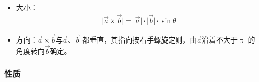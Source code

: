 \documentclass[
	11pt, %
	a4paper, %
]{WhuSakuraBook}
\begin{document}
    \begin{itemize}
        \item 大小：
            \begin{align}
                \lvert \overrightarrow{a} \times \overrightarrow{b} \rvert =
                \lvert \overrightarrow{a} \rvert \cdot \lvert \overrightarrow{b} \rvert \cdot \sin\theta
            \end{align}            
        \item 方向：\(\overrightarrow{a} \times \overrightarrow{b}\)与\(\overrightarrow{a}\)、\(\overrightarrow{b}\)
            都垂直，其指向按右手螺旋定则，由\(\overrightarrow{a}\)沿着不大于\(\uppi\)
            的角度转向\(\overrightarrow{b}\)确定。
    \end{itemize}

\subsubsection*{性质}
\end{document}

